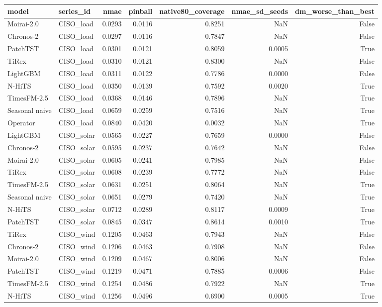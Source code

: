 \begin{tabular}{llrrrrr}
\toprule
model & series_id & nmae & pinball & native80_coverage & nmae_sd_seeds & dm_worse_than_best \\
\midrule
Moirai-2.0 & CISO_load & 0.0293 & 0.0116 & 0.8251 & NaN & False \\
Chronos-2 & CISO_load & 0.0297 & 0.0116 & 0.7847 & NaN & False \\
PatchTST & CISO_load & 0.0301 & 0.0121 & 0.8059 & 0.0005 & True \\
TiRex & CISO_load & 0.0310 & 0.0121 & 0.8300 & NaN & False \\
LightGBM & CISO_load & 0.0311 & 0.0122 & 0.7786 & 0.0000 & False \\
N-HiTS & CISO_load & 0.0350 & 0.0139 & 0.7592 & 0.0020 & True \\
TimesFM-2.5 & CISO_load & 0.0368 & 0.0146 & 0.7896 & NaN & True \\
Seasonal naive & CISO_load & 0.0659 & 0.0259 & 0.7516 & NaN & True \\
Operator & CISO_load & 0.0840 & 0.0420 & 0.0032 & NaN & True \\
LightGBM & CISO_solar & 0.0565 & 0.0227 & 0.7659 & 0.0000 & False \\
Chronos-2 & CISO_solar & 0.0595 & 0.0237 & 0.7642 & NaN & False \\
Moirai-2.0 & CISO_solar & 0.0605 & 0.0241 & 0.7985 & NaN & False \\
TiRex & CISO_solar & 0.0608 & 0.0239 & 0.7772 & NaN & False \\
TimesFM-2.5 & CISO_solar & 0.0631 & 0.0251 & 0.8064 & NaN & True \\
Seasonal naive & CISO_solar & 0.0651 & 0.0279 & 0.7420 & NaN & True \\
N-HiTS & CISO_solar & 0.0712 & 0.0289 & 0.8117 & 0.0009 & True \\
PatchTST & CISO_solar & 0.0845 & 0.0347 & 0.8614 & 0.0010 & True \\
TiRex & CISO_wind & 0.1205 & 0.0463 & 0.7943 & NaN & False \\
Chronos-2 & CISO_wind & 0.1206 & 0.0463 & 0.7908 & NaN & False \\
Moirai-2.0 & CISO_wind & 0.1209 & 0.0467 & 0.8006 & NaN & False \\
PatchTST & CISO_wind & 0.1219 & 0.0471 & 0.7885 & 0.0006 & False \\
TimesFM-2.5 & CISO_wind & 0.1254 & 0.0486 & 0.7922 & NaN & True \\
N-HiTS & CISO_wind & 0.1256 & 0.0496 & 0.6900 & 0.0005 & True \\

\end{tabular}
